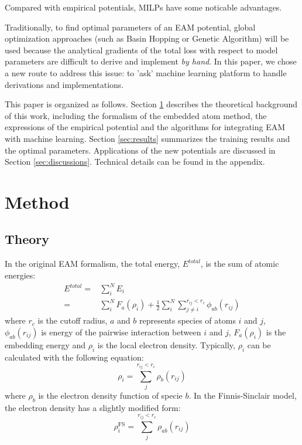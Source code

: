 \documentclass[prb,reprint]{revtex4-2}
\begin{document}
Compared with empirical potentials, MILPs have some noticable advantages. 

Traditionally, to find optimal parameters of an EAM potential, global 
optimization approaches (such as Basin Hopping or Genetic Algorithm) will be 
used because the analytical gradients of the total loss with respect to model
parameters are difficult to derive and implement \textit{by hand}. In this 
paper, we chose a new route to address this issue: to 'ask' machine learning 
platform to handle derivations and implementations. 

This paper is organized as follows. Section \ref{sec:method} describes the 
theoretical background of this work, including the formalism of the embedded 
atom method, the expressions of the empirical potential and the algorithms for 
integrating EAM with machine learning. Section \ref{sec:results} summarizes the 
training results and the optimal parameters. Applications of the new potentials 
are discussed in Section \ref{sec:discussions}. Technical details can be found 
in the appendix.

% 
%
\section{Method}
\label{sec:method}


\subsection{Theory}
\label{sec:theory}

In the original EAM formalism, the total energy, $E^{total}$, is the sum of 
atomic energies:
\begin{align}
E^{total} = & \sum_{i}^{N}{E_{i}} \nonumber \\
\label{eq:eam_total_energy}
= & \sum_{i}^{N}{F_{a}(\rho_i)} + 
    \frac{1}{2}\sum_{i}^{N}{\sum_{j \neq i}^{r_{ij} < r_c}{
    \phi_{ab}(r_{ij})
}}
\end{align}
where $r_c$ is the cutoff radius, $a$ and $b$ represents species of atoms $i$ 
and $j$, $\phi_{ab}(r_{ij})$ is energy of the pairwise interaction between $i$ 
and $j$, $F_{a}(\rho_{i})$ is the embedding energy and $\rho_{i}$ is the local 
electron density. Typically, $\rho_{i}$ can be calculated with the following 
equation:
\begin{equation}
\label{eq:rho_eam}
\rho_{i} = \sum_{j}^{r_{ij} < r_{c}}{
    \rho_{b}(r_{ij})
}
\end{equation}
where $\rho_{b}$ is the electron density function of specie $b$. In the 
Finnis-Sinclair model, the electron density has a slightly modified form:
\begin{equation}
\label{eq:rho_fs}
\rho_{i}^{\mathrm{FS}} = \sum_{j}^{r_{ij} < r_{c}}{
    \rho_{ab}(r_{ij})
}
\end{equation}
\end{document}
